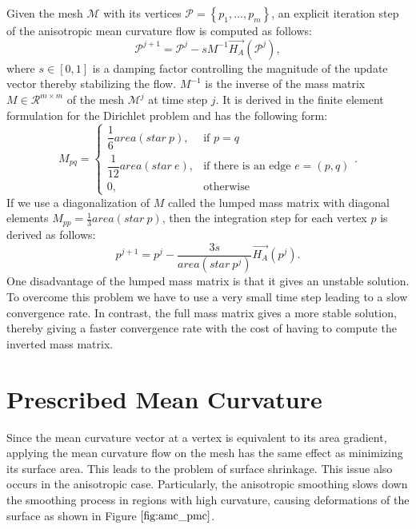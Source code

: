 \documentclass[11pt]{article}
\begin{document}
Given the mesh $\mathcal{M}$ with its vertices $\mathcal{P} = \left\lbrace p_1, ..., p_m \right\rbrace $, an explicit iteration step of the anisotropic mean curvature flow is computed as follows:
\begin{equation}
\mathcal{P}^{j+1} = \mathcal{P}^j -sM^{-1}\vec{H_A}(\mathcal{P}^j),
\label{eq:explicit}
\end{equation}
where $s \in [0, 1]$ is a damping factor controlling the magnitude of the update vector thereby stabilizing the flow. $M^{-1}$ is the inverse of the mass matrix $M \in \mathcal{R}^{m \times m}$ of the mesh $\mathcal{M}^j$ at time step $j$. It is derived in the finite element formulation for the Dirichlet problem \cite{Wardetzky08Cotan} and has the following form:
\begin{equation}
M_{pq} = 
\begin{cases} \dfrac{1}{6}area(star\ p), & \mbox{if } p=q \\ 
\dfrac{1}{12}area(star\ e), & \mbox{if there is an edge } e=(p, q) \\
0, & \mbox{otherwise} \end{cases}.
\label{eq:mass_matrix}
\end{equation}
If we use a diagonalization of $M$ called the lumped mass matrix with diagonal elements $M_{pp} = \frac{1}{3} area(star\ p)$, then the integration step for each vertex $p$ is derived as follows:
\begin{equation}
p^{j+1} = p^{j} - \dfrac{3s}{area(star\ p^j)}\vec{H_A}(p^j).
\end{equation}
One disadvantage of the lumped mass matrix is that it gives an unstable solution. To overcome this problem we have to use a very small time step leading to a slow convergence rate. In contrast, the full mass matrix gives a more stable solution, thereby giving a faster convergence rate with the cost of having to compute the inverted mass matrix.

\section{Prescribed Mean Curvature}

Since the mean curvature vector at a vertex is equivalent to its area gradient, applying the mean curvature flow on the mesh has the same effect as minimizing its surface area. This leads to the problem of surface shrinkage. This issue also occurs in the anisotropic case. Particularly, the anisotropic smoothing slows down the smoothing process in regions with high curvature, causing
deformations of the surface as shown in Figure $\ref{fig:amc_pmc}$.
\end{document}

